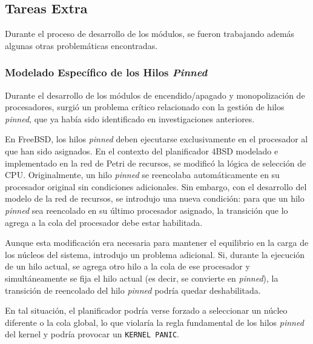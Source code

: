 \subsection{Tareas Extra}

Durante el proceso de desarrollo de los módulos, se fueron trabajando además algunas otras problemáticas encontradas.

\subsubsection{Modelado Específico de los Hilos \textit{Pinned}}

Durante el desarrollo de los módulos de encendido/apagado y monopolización de procesadores, surgió un problema crítico relacionado con la gestión de hilos \textit{pinned}, que ya había sido identificado en investigaciones anteriores.

En FreeBSD, los hilos \textit{pinned} deben ejecutarse exclusivamente en el procesador al que han sido asignados. En el contexto del planificador 4BSD modelado e implementado en la red de Petri de recursos, se modificó la lógica de selección de CPU. Originalmente, un hilo \textit{pinned} se reencolaba automáticamente en su procesador original sin condiciones adicionales. Sin embargo, con el desarrollo del modelo de la red de recursos, se introdujo una nueva condición: para que un hilo \textit{pinned} sea reencolado en su último procesador asignado, la transición que lo agrega a la cola del procesador debe estar habilitada.

Aunque esta modificación era necesaria para mantener el equilibrio en la carga de los núcleos del sistema, introdujo un problema adicional. Si, durante la ejecución de un hilo actual, se agrega otro hilo a la cola de ese procesador y simultáneamente se fija el hilo actual (es decir, se convierte en \textit{pinned}), la transición de reencolado del hilo \textit{pinned} podría quedar deshabilitada.

En tal situación, el planificador podría verse forzado a seleccionar un núcleo diferente o la cola global, lo que violaría la regla fundamental de los hilos \textit{pinned} del kernel y podría provocar un \texttt{KERNEL PANIC}.



